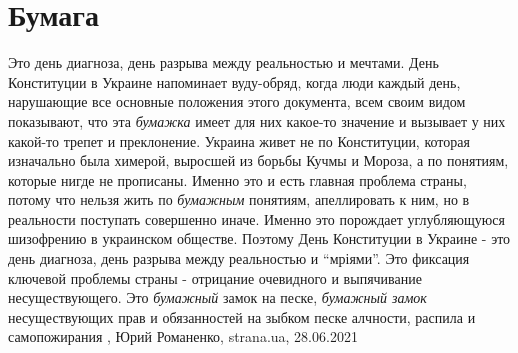  
 
 
 
 
\chapter{Бумага}
\label{sec:slova.bumaga}

Это день диагноза, день разрыва между реальностью и мечтами. День Конституции
в Украине напоминает вуду-обряд, когда люди каждый день, нарушающие все
основные положения этого документа, всем своим видом показывают, что эта
\emph{бумажка} имеет для них какое-то значение и вызывает у них какой-то трепет
и преклонение. Украина живет не по Конституции, которая изначально была
химерой, выросшей из борьбы Кучмы и Мороза, а по понятиям, которые нигде не
прописаны.  Именно это и есть главная проблема страны, потому что нельзя жить
по \emph{бумажным} понятиям, апеллировать к ним, но в реальности поступать
совершенно иначе.  Именно это порождает углубляющуюся шизофрению в украинском
обществе.  Поэтому День Конституции в Украине - это день диагноза, день разрыва
между реальностью и \enquote{мріями}. Это фиксация ключевой проблемы страны -
отрицание очевидного и выпячивание несуществующего. Это \emph{бумажный} замок
на песке, \emph{бумажный замок} несуществующих прав и обязанностей на зыбком
песке алчности, распила и самопожирания
, 
Юрий Романенко, strana.ua, 28.06.2021

